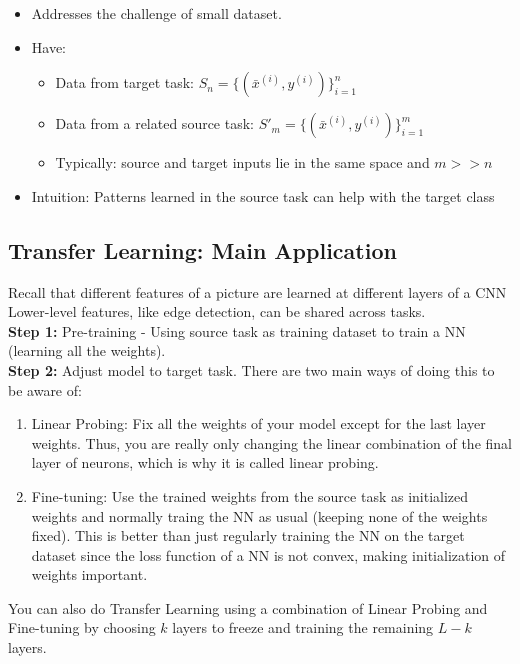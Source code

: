 \documentclass[12pt]{article}
\begin{document}
\begin{itemize}
	\item Addresses the challenge of small dataset. 
	\item Have:
		\begin{itemize}
			\item Data from target task: $S_n = \{ (\bar x^{(i)}, y^{(i)}) \}_{i=1}^n$
			\item Data from a related source task: $S'_m = \{ (\bar x^{(i)}, y^{(i)}) \}_{i=1}^m$
			\item Typically: source and target inputs lie in the same space and $m >> n$
		\end{itemize}
	\item Intuition: Patterns learned in the source task can help with the target class
\end{itemize}

\subsection{Transfer Learning: Main Application}

Recall that different features of a picture are learned at different layers of a CNN Lower-level features, like edge detection, can be shared across tasks.\\

\textbf{Step 1:} Pre-training - Using source task as training dataset to train a NN (learning all the weights).\\

\textbf{Step 2:} Adjust model to target task. There are two main ways of doing this to be aware of:

\begin{enumerate}
	\item Linear Probing: Fix all the weights of your model except for the last layer weights. Thus, you are really only changing the linear combination of the final layer of neurons, which is why it is called linear probing. 
	\item Fine-tuning: Use the trained weights from the source task as initialized weights and normally traing the NN as usual (keeping none of the weights fixed). This is better than just regularly training the NN on the target dataset since the loss function of a NN is not convex, making initialization of weights important.
\end{enumerate}

You can also do Transfer Learning using a combination of Linear Probing and Fine-tuning by choosing $k$ layers to freeze and training the remaining $L-k$ layers. 
\end{document}
